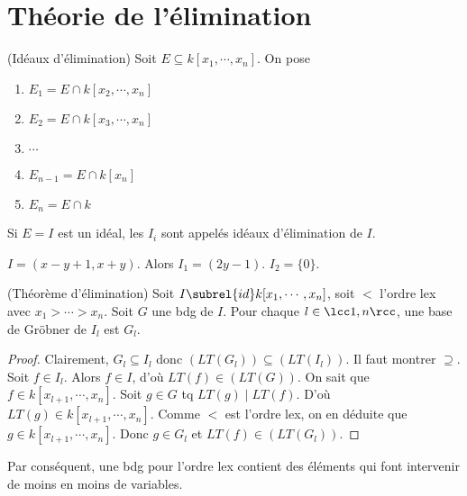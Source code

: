 \chapter{Théorie de l'élimination}
    \begin{defi} (Idéaux d'élimination)
        Soit $E \subseteq k[x_1, \cdots, x_n]$. On pose
        \begin{enumerate}
            \item $E_1 = E \cap k[x_2, \cdots, x_n]$
            \item $E_2 = E \cap k[x_3, \cdots, x_n]$
            \item $\cdots$
            \item $E_{n-1} = E \cap k[x_n]$
            \item $E_n = E \cap k$
        \end{enumerate}
        Si $E = I$ est un idéal, les $I_i$ sont appelés idéaux d'élimination de $I$.
    \end{defi}
    \begin{expl}
        $I = (x-y+1, x+y)$. Alors $I_1 = (2y - 1)$. $I_2 = \{0\}$.
    \end{expl}
    \begin{theo} (Théorème d'élimination)
        Soit $I \subrel{id} k[x_1, \cdots, x_n]$, soit $<$ l'ordre lex avec $x_1 > \cdots > x_n$. Soit $G$ une bdg de $I$. Pour chaque $l \in \lcc 1,n \rcc$, une base de Gröbner de $I_l$ est $G_l$.
    \end{theo}
    \begin{proof}
        Clairement, $G_l \subseteq I_l$ donc $(LT(G_l)) \subseteq (LT(I_l))$. Il faut montrer $\supseteq$. Soit $f \in I_l$. Alors $f \in I$, d'où $LT(f) \in (LT(G))$. On sait que $f \in k[x_{l+1}, \cdots, x_n]$. Soit $g \in G$ tq $LT(g) \mid LT(f)$. D'où $LT(g) \in k[x_{l+1}, \cdots, x_n]$. Comme $<$ est l'ordre lex, on en déduite que $g \in k[x_{l+1}, \cdots, x_n]$. Donc $g \in G_l$ et $LT(f) \in (LT(G_l))$.
    \end{proof}
    Par conséquent, une bdg pour l'ordre lex contient des éléments qui font intervenir de moins en moins de variables.

